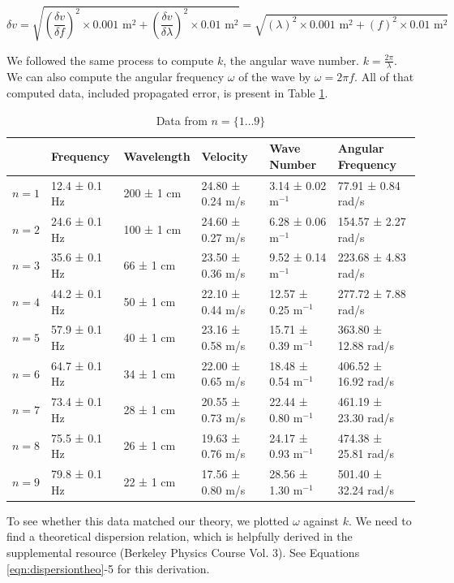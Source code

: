 \documentclass[12pt,letterpaper]{article}
\begin{document}
\begin{equation*}
    \delta v = \sqrt{\left(\frac{\delta v}{\delta f}\right)^2 \times 0.001 \text{ m}^2 + \left(\frac{\delta v}{\delta \lambda}\right)^2 \times 0.01 \text{ m}^2}=\sqrt{\left(\lambda\right)^2 \times 0.001 \text{ m}^2 + \left(f\right)^2 \times 0.01 \text{ m}^2}
\end{equation*}

We followed the same process to compute $k$, the angular wave number. $k=\frac{2\pi}{\lambda}$. We can also compute the angular frequency $\omega$ of the wave by $\omega=2\pi f$. All of that computed data, included propagated error, is present in Table \ref{tab:data}.

\begin{table}[]
\centering
\begin{tabular}{|l|l|l|l|l|l|}
\hline
      & Frequency     & Wavelength & Velocity & Wave Number& Angular Frequency \\ \hline
$n=1$ & 12.4 ± 0.1 Hz & 200 ± 1 cm & 24.80 ± 0.24 m/s & 3.14 ± 0.02 m$^{-1}$ & 77.91 ± 0.84 rad/s \\ \hline
$n=2$ & 24.6 ± 0.1 Hz & 100 ± 1 cm & 24.60 ± 0.27 m/s & 6.28 ± 0.06 m$^{-1}$ & 154.57 ± 2.27 rad/s \\ \hline
$n=3$ & 35.6 ± 0.1 Hz & 66 ± 1 cm & 23.50 ± 0.36 m/s & 9.52 ± 0.14 m$^{-1}$ & 223.68 ± 4.83 rad/s \\ \hline
$n=4$ & 44.2 ± 0.1 Hz & 50 ± 1 cm & 22.10 ± 0.44 m/s & 12.57 ± 0.25 m$^{-1}$ & 277.72 ± 7.88 rad/s \\ \hline
$n=5$ & 57.9 ± 0.1 Hz & 40 ± 1 cm & 23.16 ± 0.58 m/s & 15.71 ± 0.39 m$^{-1}$ & 363.80 ± 12.88 rad/s \\ \hline
$n=6$ & 64.7 ± 0.1 Hz & 34 ± 1 cm & 22.00 ± 0.65 m/s & 18.48 ± 0.54 m$^{-1}$ & 406.52 ± 16.92 rad/s \\ \hline
$n=7$ & 73.4 ± 0.1 Hz & 28 ± 1 cm & 20.55 ± 0.73 m/s & 22.44 ± 0.80 m$^{-1}$ & 461.19 ± 23.30 rad/s \\ \hline
$n=8$ & 75.5 ± 0.1 Hz & 26 ± 1 cm & 19.63 ± 0.76 m/s & 24.17 ± 0.93 m$^{-1}$ & 474.38 ± 25.81 rad/s \\ \hline
$n=9$ & 79.8 ± 0.1 Hz & 22 ± 1 cm & 17.56 ± 0.80 m/s & 28.56 ± 1.30 m$^{-1}$ & 501.40 ± 32.24 rad/s \\ \hline
\end{tabular}
\label{tab:data}
\caption{Data from $n=\{1\dots9\}$}
\end{table}

To see whether this data matched our theory, we plotted $\omega$ against $k$. We need to find a theoretical dispersion relation, which is helpfully derived in the supplemental resource (Berkeley Physics Course Vol. 3). See Equations \ref{eqn:dispersiontheo}-5 for this derivation. 
\end{document}
